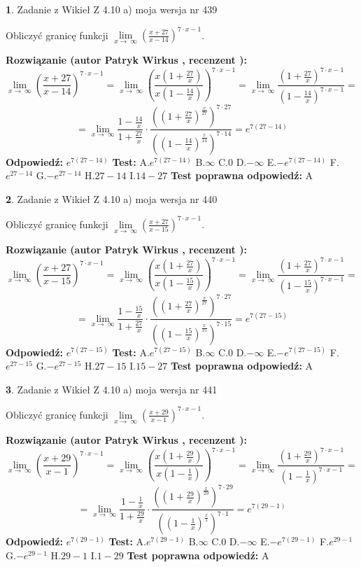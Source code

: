 \documentclass[12pt, a4paper]{article}
\theoremstyle{definition} %
\newtheorem{zad}{}
\newcommand{\zadStart}[1]{\begin{zad}#1\newline}
\newcommand{\zadStop}{\end{zad}}
\newcommand{\rozwStart}[2]{\noindent \textbf{Rozwiązanie (autor #1 , recenzent #2): }\newline}
\newcommand{\rozwStop}{\newline}
\newcommand{\odpStart}{\noindent \textbf{Odpowiedź:}\newline}
\newcommand{\odpStop}{\newline}
\newcommand{\testStart}{\noindent \textbf{Test:}\newline}
\newcommand{\testStop}{\newline}
\newcommand{\kluczStart}{\noindent \textbf{Test poprawna odpowiedź:}\newline}
\newcommand{\kluczStop}{\newline}
\begin{document}
\zadStart{Zadanie z Wikieł Z 4.10 a) moja wersja nr 439}


Obliczyć granicę funkcji  $\lim\limits_{x\to\ \infty}(\frac{x+27}{x-14})^{7\cdot x-1}$.
\zadStop
\rozwStart{Patryk Wirkus}{}
$$\lim\limits_{x\to\ \infty}(\frac{x+27}{x-14})^{7\cdot x-1} = \lim\limits_{x\to\ \infty}(\frac{x(1+\frac{27}{x})}{x(1-\frac{14}{x})})^{7\cdot x-1}=\lim\limits_{x\to\ \infty}\frac{(1+\frac{27}{x})^{7\cdot x-1}}{(1-\frac{14}{x})^{7\cdot x-1}}=$$
$$=\lim\limits_{x\to\ \infty}\frac{1-\frac{14}{x}}{1+\frac{27}{x}}\cdot\frac{((1+\frac{27}{x})^{\frac{x}{27}})^{7\cdot27}}{((1-\frac{14}{x})^{\frac{x}{14}})^{7\cdot14}}=e^{7(27-14)}$$
\rozwStop
\odpStart
$e^{7(27-14)}$
\odpStop
\testStart
A.$e^{7(27-14)}$ B.$\infty$ C.$0$ D.$-\infty$ E.$-e^{7(27-14)}$
F.$e^{27-14}$ G.$-e^{27-14}$
H.$27-14$
I.$14-27$
\testStop
\kluczStart
A
\kluczStop



\zadStart{Zadanie z Wikieł Z 4.10 a) moja wersja nr 440}


Obliczyć granicę funkcji  $\lim\limits_{x\to\ \infty}(\frac{x+27}{x-15})^{7\cdot x-1}$.
\zadStop
\rozwStart{Patryk Wirkus}{}
$$\lim\limits_{x\to\ \infty}(\frac{x+27}{x-15})^{7\cdot x-1} = \lim\limits_{x\to\ \infty}(\frac{x(1+\frac{27}{x})}{x(1-\frac{15}{x})})^{7\cdot x-1}=\lim\limits_{x\to\ \infty}\frac{(1+\frac{27}{x})^{7\cdot x-1}}{(1-\frac{15}{x})^{7\cdot x-1}}=$$
$$=\lim\limits_{x\to\ \infty}\frac{1-\frac{15}{x}}{1+\frac{27}{x}}\cdot\frac{((1+\frac{27}{x})^{\frac{x}{27}})^{7\cdot27}}{((1-\frac{15}{x})^{\frac{x}{15}})^{7\cdot15}}=e^{7(27-15)}$$
\rozwStop
\odpStart
$e^{7(27-15)}$
\odpStop
\testStart
A.$e^{7(27-15)}$ B.$\infty$ C.$0$ D.$-\infty$ E.$-e^{7(27-15)}$
F.$e^{27-15}$ G.$-e^{27-15}$
H.$27-15$
I.$15-27$
\testStop
\kluczStart
A
\kluczStop



\zadStart{Zadanie z Wikieł Z 4.10 a) moja wersja nr 441}


Obliczyć granicę funkcji  $\lim\limits_{x\to\ \infty}(\frac{x+29}{x-1})^{7\cdot x-1}$.
\zadStop
\rozwStart{Patryk Wirkus}{}
$$\lim\limits_{x\to\ \infty}(\frac{x+29}{x-1})^{7\cdot x-1} = \lim\limits_{x\to\ \infty}(\frac{x(1+\frac{29}{x})}{x(1-\frac{1}{x})})^{7\cdot x-1}=\lim\limits_{x\to\ \infty}\frac{(1+\frac{29}{x})^{7\cdot x-1}}{(1-\frac{1}{x})^{7\cdot x-1}}=$$
$$=\lim\limits_{x\to\ \infty}\frac{1-\frac{1}{x}}{1+\frac{29}{x}}\cdot\frac{((1+\frac{29}{x})^{\frac{x}{29}})^{7\cdot29}}{((1-\frac{1}{x})^{\frac{x}{1}})^{7\cdot1}}=e^{7(29-1)}$$
\rozwStop
\odpStart
$e^{7(29-1)}$
\odpStop
\testStart
A.$e^{7(29-1)}$ B.$\infty$ C.$0$ D.$-\infty$ E.$-e^{7(29-1)}$
F.$e^{29-1}$ G.$-e^{29-1}$
H.$29-1$
I.$1-29$
\testStop
\kluczStart
A
\kluczStop
\end{document}
